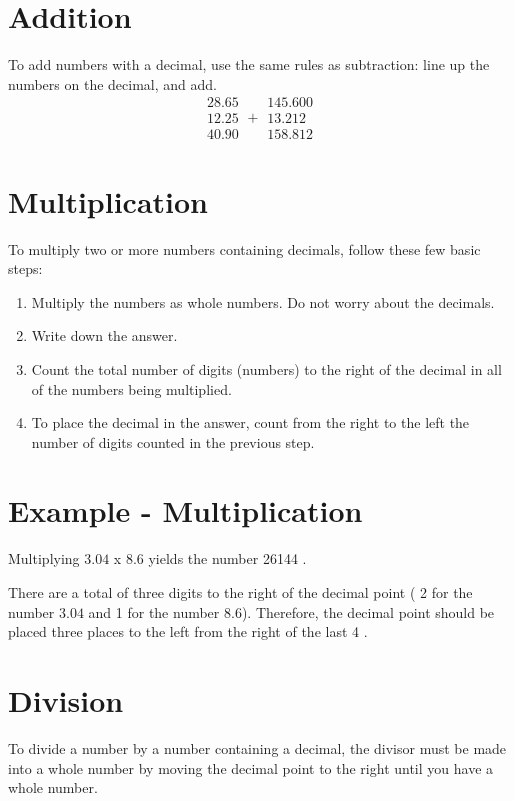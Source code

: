 \documentclass[10pt]{article}
\begin{document}
\section{Addition}
To add numbers with a decimal, use the same rules as subtraction: line up the numbers on the decimal, and add.
$$
\begin{array}{r}
28.65 \\
12.25 \\
\hline 40.90
\end{array}+\begin{array}{r}
145.600 \\
13.212 \\
\hline 158.812
\end{array}
$$

\section{Multiplication}
To multiply two or more numbers containing decimals, follow these few basic steps:

\begin{enumerate}
  \item Multiply the numbers as whole numbers. Do not worry about the decimals.

  \item Write down the answer.

  \item Count the total number of digits (numbers) to the right of the decimal in all of the numbers being multiplied.

  \item To place the decimal in the answer, count from the right to the left the number of digits counted in the previous step.

\end{enumerate}
\section{Example - Multiplication}
Multiplying $3.04$ x $8.6$ yields the number 26144 .

There are a total of three digits to the right of the decimal point ( 2 for the number $3.04$ and 1 for the number 8.6). Therefore, the decimal point should be placed three places to the left from the right of the last 4 .

\section{Division}
To divide a number by a number containing a decimal, the divisor must be made into a whole number by moving the decimal point to the right until you have a whole number.
\end{document}
